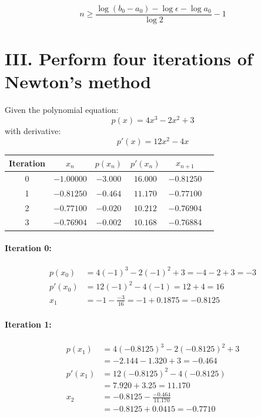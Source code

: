 \documentclass[a4paper]{article}
\begin{document}
\[
\boxed{n \geq \frac{\log(b_0 - a_0) - \log \epsilon - \log a_0}{\log 2} - 1}
\]

\section*{III. Perform four iterations of Newton’s method}

Given the polynomial equation:
\[
p(x) = 4x^3 - 2x^2 + 3
\]
with derivative:
\[
p'(x) = 12x^2 - 4x
\]

\begin{table}[h]
\centering
\begin{tabular}{cccccc}
\toprule
Iteration & $x_n$ & $p(x_n)$ & $p'(x_n)$ & $x_{n+1}$ \\
\midrule
0 & $-1.00000$ & $-3.000$ & $16.000$ & $-0.81250$ \\
1 & $-0.81250$ & $-0.464$ & $11.170$ & $-0.77100$ \\
2 & $-0.77100$ & $-0.020$ & $10.212$ & $-0.76904$ \\
3 & $-0.76904$ & $-0.002$ & $10.168$ & $-0.76884$ \\
\bottomrule
\end{tabular}
\end{table}

\paragraph*{Iteration 0:}
\begin{align*}
p(x_0) &= 4(-1)^3 - 2(-1)^2 + 3 = -4 - 2 + 3 = -3 \\
p'(x_0) &= 12(-1)^2 - 4(-1) = 12 + 4 = 16 \\
x_1 &= -1 - \frac{-3}{16} = -1 + 0.1875 = -0.8125
\end{align*}

\paragraph*{Iteration 1:}
\begin{align*}
p(x_1) &= 4(-0.8125)^3 - 2(-0.8125)^2 + 3 \\
&= -2.144 - 1.320 + 3 = -0.464 \\
p'(x_1) &= 12(-0.8125)^2 - 4(-0.8125) \\
&= 7.920 + 3.25 = 11.170 \\
x_2 &= -0.8125 - \frac{-0.464}{11.170} \\
&= -0.8125 + 0.0415 = -0.7710
\end{align*}
\end{document}
